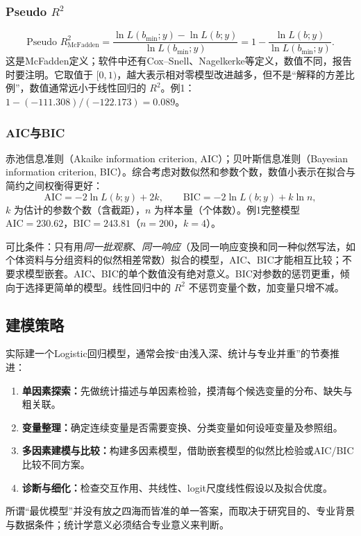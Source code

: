 \subsubsection{Pseudo $R^2$}
\[
\text{Pseudo }R^2_{\text{McFadden}}=\frac{\ln L(b_{\min};y)-\ln L(b;y)}{\ln L(b_{\min};y)}=1-\frac{\ln L(b;y)}{\ln L(b_{\min};y)}.
\]
这是McFadden定义；软件中还有Cox--Snell、Nagelkerke等定义，数值不同，报告时要注明。它取值于 $[0,1)$，越大表示相对零模型改进越多，但不是“解释的方差比例”，数值通常远小于线性回归的 $R^2$。例1：$1-(-111.308)/(-122.173)=0.089$。
\subsubsection{AIC与BIC}
赤池信息准则（Akaike information criterion, AIC）；贝叶斯信息准则（Bayesian information criterion, BIC）。综合考虑对数似然和参数个数，数值小表示在拟合与简约之间权衡得更好：
\[
\mathrm{AIC}=-2\ln L(b;y)+2k,\qquad \mathrm{BIC}=-2\ln L(b;y)+k\ln n,
\]
$k$ 为估计的参数个数（含截距），$n$ 为样本量（个体数）。例1完整模型 $\mathrm{AIC}=230.62$，$\mathrm{BIC}=243.81$（$n=200$，$k=4$）。
\begin{annotation}可比条件：只有用\emph{同一批观察}、\emph{同一响应}（及同一响应变换和同一种似然写法，如个体资料与分组资料的似然相差常数）拟合的模型，AIC、BIC才能相互比较；不要求模型嵌套。AIC、BIC的单个数值没有绝对意义。BIC对参数的惩罚更重，倾向于选择更简单的模型。线性回归中的 $R^2$ 不惩罚变量个数，加变量只增不减。\end{annotation}
\subsection{建模策略}
实际建一个Logistic回归模型，通常会按“由浅入深、统计与专业并重”的节奏推进：
\begin{enumerate}
\item \textbf{单因素探索：}先做统计描述与单因素检验，摸清每个候选变量的分布、缺失与粗关联。
\item \textbf{变量整理：}确定连续变量是否需要变换、分类变量如何设哑变量及参照组。
\item \textbf{多因素建模与比较：}构建多因素模型，借助嵌套模型的似然比检验或AIC/BIC比较不同方案。
\item \textbf{诊断与细化：}检查交互作用、共线性、logit尺度线性假设以及拟合优度。
\end{enumerate}
所谓“最优模型”并没有放之四海而皆准的单一答案，而取决于研究目的、专业背景与数据条件；统计学意义必须结合专业意义来判断。

